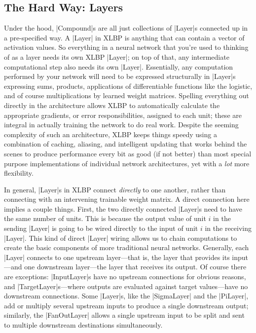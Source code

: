 \documentclass{article}
\begin{document}
\subsection{The Hard Way: Layers}

Under the hood, |Compound|s are all just collections of |Layer|s connected up 
in a pre-specified way. A |Layer| in XLBP is anything that can contain a vector of
activation values. So everything in a neural network that you're used to thinking of as a layer
needs its own XLBP |Layer|; on top of that, any intermediate computational step also
needs its own |Layer|. Essentially, any computation performed by your network will need
to be expressed structurally in |Layer|s expressing sums, products, applications of
differentiable functions like the logistic, and of course multiplications by learned weight
matrices. Spelling everything out directly in the architecture allows XLBP to automatically 
calculate the appropriate gradients, or error responsibilities, assigned to each unit; these are
integral in actually training the network to do real work. Despite the seeming complexity of such an
architecture, XLBP keeps things speedy using a combination of caching, aliasing, and intelligent
updating that works behind the scenes to produce performance every bit as good (if not better) than
most special purpose implementations of individual network architectures, yet with a \textit{lot}
more flexibility.

In general, |Layer|s in XLBP connect \textit{directly} to one another, rather than 
connecting with an intervening trainable weight matrix. A direct connection here implies a couple
things. First, the two directly connected |Layer|s need to have the same number of units.
This is because the output value of unit $i$ in the sending |Layer| is going to be wired
directly to the input of unit $i$ in the receiving |Layer|. This kind of direct
|Layer| wiring allows us to chain computations to create the basic components of more
traditional neural networks. Generally, each |Layer| connects to one upstream layer---that is, the layer that provides its input---and one downstream layer---the layer that receives its output. Of course there are exceptions: |InputLayer|s have no upstream connections for obvious 
reasons, and |TargetLayer|s---where outputs are evaluated against target values---have
no downstream connections. Some |Layer|s, like the |SigmaLayer| and the 
|PiLayer|, add or multiply several upstream inputs to produce a single downstream output;
similarly, the |FanOutLayer| allows a single upstream input to be split and sent to 
multiple downstream destinations simultaneously.
\end{document}
